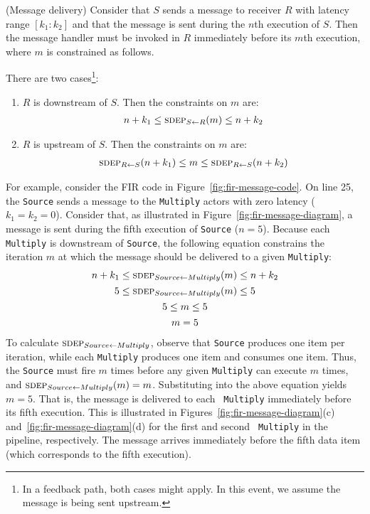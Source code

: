 \begin{definition}(Message delivery)
Consider that $S$ sends a message to receiver $R$ with latency range
$[k_1:k_2]$ and that the message is sent during the $n$th execution of
$S$.  Then the message handler must be invoked in $R$ immediately
before its $m$th execution, where $m$ is constrained as follows.

There are two cases\footnote{\small In a feedback path, both cases might apply.  In this event, we assume the message is being sent upstream.}:
\begin{enumerate}

\item $R$ is downstream of $S$.  Then the constraints on $m$ are:
\[
\begin{array}{l}
n+k_1 \le \sdepf{S}{R}(m) \le n+k_2
\end{array}
\]

\item $R$ is upstream of $S$.  Then the constraints on $m$ are:
\[
\begin{array}{l}
\sdepf{R}{S}(n + k_1) \le m \le \sdepf{R}{S}(n + k_2)
\end{array}
\]
\end{enumerate}
\end{definition}

For example, consider the FIR code in
Figure~\ref{fig:fir-message-code}.  On line 25, the {\tt Source} sends
a message to the {\tt Multiply} actors with zero latency ($k_1 = k_2 =
0$).  Consider that, as illustrated in
Figure~\ref{fig:fir-message-diagram}, a message is sent during the
fifth execution of {\tt Source} ($n = 5$).  Because each {\tt
Multiply} is downstream of {\tt Source}, the following equation
constrains the iteration $m$ at which the message should be delivered
to a given {\tt Multiply}:
\begin{equation*}
\begin{array}{c}
n+k_1 \le \sdepf{Source}{Multiply}(m) \le n + k_2 \\[0.9Ex]
5 \le \sdepf{Source}{Multiply}(m) \le 5 \\[0.9Ex]
5 \le m \le 5 \\[0.9Ex]
m = 5
\end{array}
\end{equation*}
To calculate $\sdepf{Source}{Multiply}$, observe that {\tt Source}
produces one item per iteration, while each {\tt Multiply} produces
one item and consumes one item.  Thus, the {\tt Source} must fire $m$
times before any given {\tt Multiply} can execute $m$ times, and
$\sdepf{Source}{Multiply}(m) = m$.  Substituting into the above
equation yields $m=5$.  That is, the message is delivered to each {\tt
Multiply} immediately before its fifth execution.  This is illustrated
in Figures~\ref{fig:fir-message-diagram}(c)
and~\ref{fig:fir-message-diagram}(d) for the first and second {\tt
Multiply} in the pipeline, respectively.  The message arrives
immediately before the fifth data item (which corresponds to the fifth
execution).

